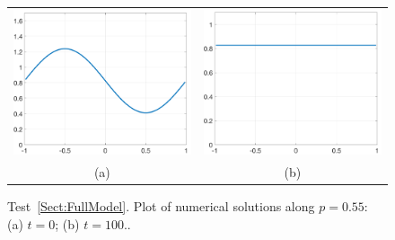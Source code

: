 \documentclass[preprint,11pt]{elsarticle}
\begin{document}
\begin{figure}[H]
\centering
\begin{tabular}{cc}
\includegraphics[width=.45\textwidth]{./NumFig/FullModel2D-4-0-cross}
&\includegraphics[width=.45\textwidth]{./NumFig/FullModel2D-4-100-cross}\\
(a) & (b)
\end{tabular}
\caption{Test~\ref{Sect:FullModel}. Plot of numerical solutions along $p = 0.55$:  (a) $t = 0$; (b) $t=100$..}
\end{figure}

%
%
\end{document}
